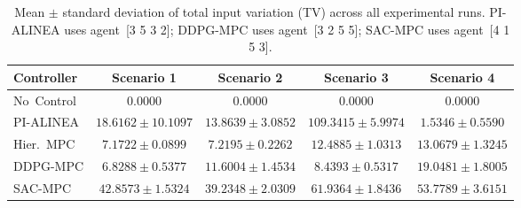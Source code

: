 \begin{table}[htbp]
\centering
\caption{Mean $\pm$ standard deviation of total input variation (TV) across all experimental runs. PI-ALINEA uses agent~[3 5 3 2]; DDPG-MPC uses agent~[3 2 5 5]; SAC-MPC uses agent~[4 1 5 3].}
\label{tab:tv_comparison_agent}
\begin{tabular}{lcccc}
\toprule
Controller & Scenario 1 & Scenario 2 & Scenario 3 & Scenario 4 \\
\midrule
No~Control & $0.0000$ & $0.0000$ & $0.0000$ & $0.0000$ \\
PI-ALINEA & $18.6162 \pm 10.1097$ & $13.8639 \pm 3.0852$ & $109.3415 \pm 5.9974$ & $1.5346 \pm 0.5590$ \\
Hier.~MPC & $7.1722 \pm 0.0899$ & $7.2195 \pm 0.2262$ & $12.4885 \pm 1.0313$ & $13.0679 \pm 1.3245$ \\
DDPG-MPC & $6.8288 \pm 0.5377$ & $11.6004 \pm 1.4534$ & $8.4393 \pm 0.5317$ & $19.0481 \pm 1.8005$ \\
SAC-MPC & $42.8573 \pm 1.5324$ & $39.2348 \pm 2.0309$ & $61.9364 \pm 1.8436$ & $53.7789 \pm 3.6151$ \\
\bottomrule
\end{tabular}
\end{table}
